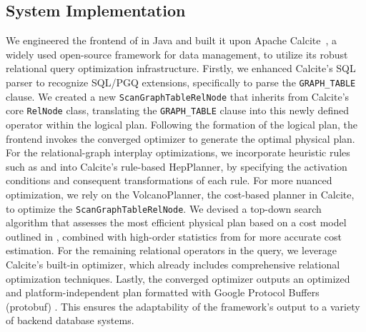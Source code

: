 \subsection{System Implementation}
We engineered the frontend of \name in Java and built it upon Apache Calcite~\cite{calcite}, a widely used open-source framework for data management, to utilize its robust relational query optimization infrastructure.
Firstly, we enhanced Calcite's SQL parser to recognize SQL/PGQ extensions, specifically to parse the \lstinline{GRAPH_TABLE} clause.
We created a new \lstinline{ScanGraphTableRelNode} that inherits from Calcite's core \lstinline{RelNode} class, translating the \lstinline{GRAPH_TABLE} clause into this newly defined operator within the logical plan.
Following the formation of the logical plan, the frontend invokes the converged optimizer to generate the optimal physical plan.
For the relational-graph interplay optimizations, we incorporate heuristic rules such as \filterrule and \joinfuserule into Calcite's rule-based HepPlanner, by specifying the activation conditions and consequent transformations of each rule.
For more nuanced optimization, we rely on the VolcanoPlanner, the cost-based planner in Calcite, to optimize the \lstinline{ScanGraphTableRelNode}.
We devised a top-down search algorithm that assesses the most efficient physical plan based on a cost model outlined in , combined with high-order statistics from \glogue for more accurate cost estimation.
For the remaining relational operators in the query, we leverage Calcite's built-in optimizer, which already includes comprehensive relational optimization techniques.
Lastly, the converged optimizer outputs an optimized and platform-independent plan formatted with Google Protocol Buffers (protobuf) \cite{protobuf}. This ensures the adaptability of the \name framework's output to a variety of backend database systems.


